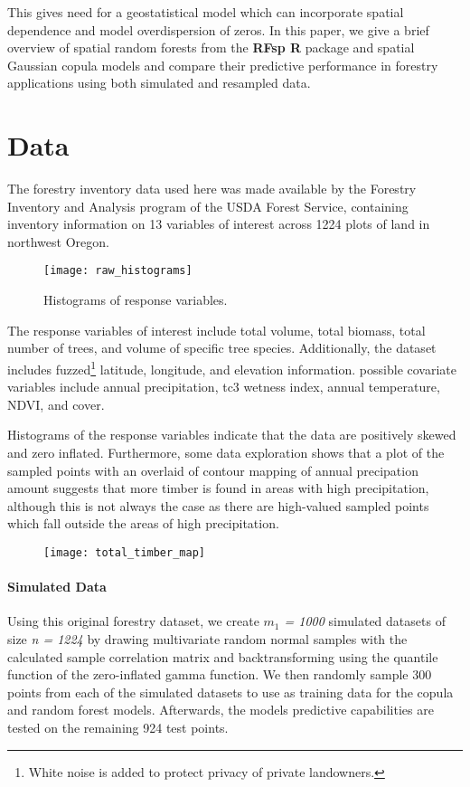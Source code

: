 \documentclass{article}
\begin{document}
This gives need for a geostatistical model which can incorporate spatial dependence and model overdispersion of zeros.
In this paper, we give a brief overview of spatial random forests from the \textbf{RFsp R} package\cite{hengl18} and spatial Gaussian copula models\cite{madsen09} and compare their predictive performance in forestry applications using both simulated and resampled data.

\section{Data}

The forestry inventory data used here was made available by the Forestry Inventory and Analysis program of the USDA Forest Service, containing inventory information on 13 variables of interest across 1224 plots of land in northwest Oregon.

\begin{wrapfigure}{r}{.4\textwidth}
	\texttt{[image: raw\_histograms]}
	\caption{Histograms of response variables.}
\end{wrapfigure}

The response variables of interest include total volume, total biomass, total number of trees, and volume of specific tree species.
Additionally, the dataset includes fuzzed\footnote{White noise is added to protect privacy of private landowners.} latitude, longitude, and elevation information.
possible covariate variables include annual precipitation, tc3 wetness index\cite{raynolds16}, annual temperature, NDVI, and cover.

Histograms of the response variables indicate that the data are positively skewed and zero inflated.
Furthermore, some data exploration shows that a plot of the sampled points with an overlaid of contour mapping of annual precipation amount suggests that more timber is found in areas with high precipitation, although this is not always the case as there are high-valued sampled points which fall outside the areas of high precipitation.

\begin{figure}[ht]
\texttt{[image: total\_timber\_map]}
\centering
\end{figure}

\paragraph{Simulated Data} Using this original forestry dataset, we create \textit{$m_1$ = 1000} simulated datasets of size \textit{n = 1224} by drawing multivariate random normal samples with the calculated sample correlation matrix and backtransforming using the quantile function of the zero-inflated gamma function.
We then randomly sample 300 points from each of the simulated datasets to use as training data for the copula and random forest models.
Afterwards, the models predictive capabilities are tested on the remaining 924 test points.
\end{document}
